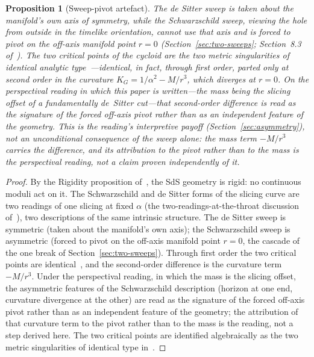 \documentclass[11pt,a4paper]{article}
\newtheorem{proposition}[theorem]{Proposition}
\theoremstyle{definition}
\begin{document}
\begin{proposition}[Sweep-pivot artefact]\label{prop:sweep}
The de Sitter sweep is taken about the manifold's own axis of symmetry, while the Schwarzschild sweep, viewing the hole from outside in the timelike orientation, cannot use that axis and is forced to pivot on the off-axis manifold point $r=0$ (Section~\ref{sec:two-sweeps}; Section~8.3 of~\cite{JanzenSlicing}). The two critical points of the cycloid are the two metric singularities of identical analytic type~\cite{JanzenCircle}---identical, in fact, through first order, parted only at second order in the curvature $K_G=1/\alpha^2-M/r^3$, which diverges at $r=0$. On the perspectival reading in which this paper is written---the mass being the slicing offset of a fundamentally de~Sitter cut---that second-order difference is read as the signature of the forced off-axis pivot rather than as an independent feature of the geometry. This is the reading's interpretive payoff (Section~\ref{sec:asymmetry}), not an unconditional consequence of the sweep alone: the mass term $-M/r^3$ carries the difference, and its attribution to the pivot rather than to the mass is the perspectival reading, not a claim proven independently of it.
\end{proposition}

\begin{proof}
By the Rigidity proposition of~\cite{JanzenSlicing}, the SdS geometry is rigid: no continuous moduli act on it. The Schwarzschild and de Sitter forms of the slicing curve are two readings of one slicing at fixed $\alpha$ (the two-readings-at-the-throat discussion of~\cite{JanzenSlicing}), two descriptions of the same intrinsic structure. The de Sitter sweep is symmetric (taken about the manifold's own axis); the Schwarzschild sweep is asymmetric (forced to pivot on the off-axis manifold point $r=0$, the cascade of the one break of Section~\ref{sec:two-sweeps}). Through first order the two critical points are identical~\cite{JanzenCircle}, and the second-order difference is the curvature term $-M/r^3$. Under the perspectival reading, in which the mass is the slicing offset, the asymmetric features of the Schwarzschild description (horizon at one end, curvature divergence at the other) are read as the signature of the forced off-axis pivot rather than as an independent feature of the geometry; the attribution of that curvature term to the pivot rather than to the mass is the reading, not a step derived here. The two critical points are identified algebraically as the two metric singularities of identical type in~\cite{JanzenCircle}.
\end{proof}
\end{document}
